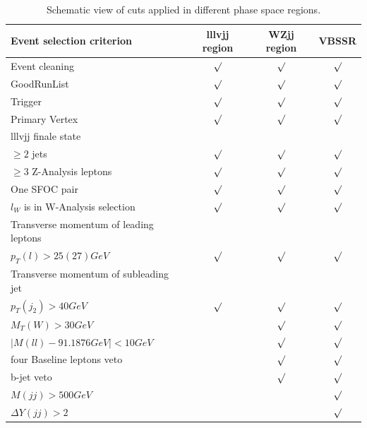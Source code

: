 \documentclass[../Bachelorarbeit.tex]{subfiles}
\begin{document}
\begin{table}[h]
    \begin{tabular}{  l c c c }
        \hline
        Event selection criterion                 & lllvjj region & WZjj region & VBSSR   \\
        \hline
        Event cleaning                            & $\surd$       & $\surd$     & $\surd$ \\
        GoodRunList                               & $\surd$       & $\surd$     & $\surd$ \\
        Trigger                                   & $\surd$       & $\surd$     & $\surd$ \\
        Primary Vertex                            & $\surd$       & $\surd$     & $\surd$ \\
        \hline
        lllvjj finale state                       &               &             &         \\
        \qquad $\geq 2$ jets                      & $\surd$       & $\surd$     & $\surd$ \\
        \qquad $\geq 3$ Z-Analysis leptons        & $\surd$       & $\surd$     & $\surd$ \\
        \qquad One SFOC pair                      & $\surd$       & $\surd$     & $\surd$ \\
        $l_{W}$ is in W-Analysis selection        & $\surd$       & $\surd$     & $\surd$ \\
        Transverse momentum of leading leptons    &               &             &         \\
        \qquad $p_{T}(l)>25(27) GeV$              & $\surd$       & $\surd$     & $\surd$ \\
        Transverse momentum of subleading jet     &               &             &         \\
        \qquad $p_{T}(j_{2})>40 GeV$              & $\surd$       & $\surd$     & $\surd$ \\
        \hline
        $M_{T}(W)>30 GeV$                         &               & $\surd$     & $\surd$ \\
        $\lvert M(ll)-91.1876 GeV\rvert < 10 GeV$ &               & $\surd$     & $\surd$ \\
        four Baseline leptons veto                &               & $\surd$     & $\surd$ \\
        b-jet veto                                &               & $\surd$     & $\surd$ \\
        \hline
        $M(jj)>500 GeV$                           &               &             & $\surd$ \\
        $\Delta Y(jj) >2$                         &               &             & $\surd$ \\
        \hline
    \end{tabular}
    \centering
    \caption{Schematic view of cuts applied in different phase space regions. \cite{Bittrich.27.05.2020}}
    \label{tab:eventselection}
\end{table}
\end{document}
